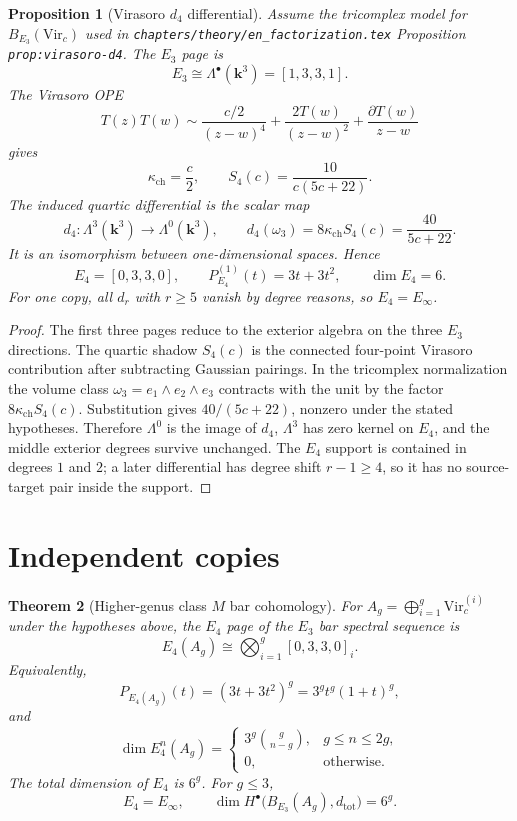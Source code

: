 \documentclass[11pt]{amsart}
\newtheorem{theorem}{Theorem}
\newtheorem{proposition}[theorem]{Proposition}
\theoremstyle{definition}
\providecommand{\kk}{\mathbf{k}}
\providecommand{\kch}{\kappa_{\mathrm{ch}}}
\providecommand{\Vir}{\mathrm{Vir}}
\providecommand{\Lam}{\Lambda}
\begin{document}
\begin{proposition}[Virasoro \(d_4\) differential]
\label{prop:virasoro-one-copy}
Assume the tricomplex model for \(B_{E_3}(\Vir_c)\) used in
\texttt{chapters/theory/en\_factorization.tex}
Proposition \texttt{prop:virasoro-d4}. The \(E_3\) page is
\[
  E_3\cong \Lam^\bullet(\kk^3)=[1,3,3,1].
\]
The Virasoro OPE
\[
  T(z)T(w)\sim
  \frac{c/2}{(z-w)^4}+\frac{2T(w)}{(z-w)^2}
  +\frac{\partial T(w)}{z-w}
\]
gives
\[
  \kch=\frac c2,\qquad
  S_4(c)=\frac{10}{c(5c+22)}.
\]
The induced quartic differential is the scalar map
\[
  d_4:\Lam^3(\kk^3)\longrightarrow \Lam^0(\kk^3),
  \qquad
  d_4(\omega_3)=8\kch S_4(c)=\frac{40}{5c+22}.
\]
It is an isomorphism between one-dimensional spaces. Hence
\[
  E_4=[0,3,3,0],
  \qquad
  P_{E_4}^{(1)}(t)=3t+3t^2,
  \qquad
  \dim E_4=6.
\]
For one copy, all \(d_r\) with \(r\geq5\) vanish by degree reasons, so
\(E_4=E_\infty\).
\end{proposition}

\begin{proof}
The first three pages reduce to the exterior algebra on the three
\(E_3\) directions. The quartic shadow \(S_4(c)\) is the connected
four-point Virasoro contribution after subtracting Gaussian pairings.
In the tricomplex normalization the volume class
\(\omega_3=e_1\wedge e_2\wedge e_3\) contracts with the unit by the
factor \(8\kch S_4(c)\). Substitution gives \(40/(5c+22)\), nonzero
under the stated hypotheses. Therefore \(\Lam^0\) is the image of
\(d_4\), \(\Lam^3\) has zero kernel on \(E_4\), and the middle
exterior degrees survive unchanged. The \(E_4\) support is contained
in degrees \(1\) and \(2\); a later differential has degree shift
\(r-1\geq4\), so it has no source-target pair inside the support.
\end{proof}

\section{Independent copies}

\begin{theorem}[Higher-genus class \(M\) bar cohomology]
\label{thm:class-m-higher-genus}
For \(A_g=\bigoplus_{i=1}^g\Vir_c^{(i)}\) under the hypotheses above,
the \(E_4\) page of the \(E_3\) bar spectral sequence is
\[
  E_4(A_g)
  \cong
  \bigotimes_{i=1}^g [0,3,3,0]_i.
\]
Equivalently,
\[
  P_{E_4(A_g)}(t)=(3t+3t^2)^g=3^g t^g(1+t)^g,
\]
and
\[
  \dim E_4^n(A_g)=
  \begin{cases}
    3^g\binom{g}{n-g}, & g\leq n\leq2g,\\
    0, & \text{otherwise}.
  \end{cases}
\]
The total dimension of \(E_4\) is \(6^g\). For \(g\leq3\),
\[
  E_4=E_\infty,\qquad
  \dim H^\bullet\bigl(B_{E_3}(A_g),d_{\mathrm{tot}}\bigr)=6^g.
\]
\end{theorem}
\end{document}

